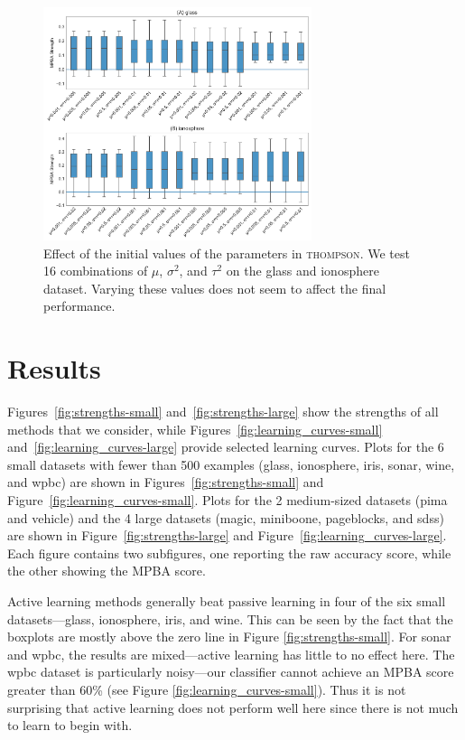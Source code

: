 \documentclass[fleqn,10pt,lineno]{wlpeerj} %
\begin{document}
\begin{figure}[p]
	\centering
	\includegraphics[width=0.7\textwidth]{Fig5}
	\caption[Effect of the parameters on Thompson sampling]{Effect of the
	initial values of the parameters in \textsc{thompson}. We test 16
	combinations of $\mu$, $\sigma^2$, and $\tau^2$ on the glass and ionosphere
	dataset. Varying these values does not seem to affect the final
	performance.}
	\label{fig:prior}
\end{figure}



\section{Results}\label{sec:results}

Figures~\ref{fig:strengths-small} and~\ref{fig:strengths-large} show the
strengths of all methods that we consider, while
Figures~\ref{fig:learning_curves-small} and~\ref{fig:learning_curves-large}
provide selected learning curves. Plots for the 6 small datasets with fewer
than 500 examples (glass, ionosphere, iris, sonar, wine, and wpbc) are shown in
Figures~\ref{fig:strengths-small} and Figure~\ref{fig:learning_curves-small}.
Plots for the 2 medium-sized datasets (pima and vehicle) and the 4 large
datasets (magic, miniboone, pageblocks, and sdss) are shown in
Figure~\ref{fig:strengths-large} and Figure~\ref{fig:learning_curves-large}.
Each figure contains two subfigures, one reporting the raw accuracy score,
while the other showing the MPBA score.

Active learning methods generally beat passive learning in four of the six
small datasets---glass, ionosphere, iris, and wine. This can be seen by the
fact that the boxplots are mostly above the zero line in Figure
\ref{fig:strengths-small}. For sonar and wpbc, the results are mixed---active
learning has little to no effect here. The wpbc dataset is particularly
noisy---our classifier cannot achieve an MPBA score greater than 60\% (see
Figure \ref{fig:learning_curves-small}). Thus it is not surprising that active
learning does not perform well here since there is not much to learn to begin
with.
\end{document}
